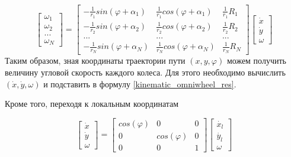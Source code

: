 \documentclass[oneside,final,14pt]{extreport}
\begin{document}
\begin{equation}
\label{kinematic_omniwheel_res}
\begin{bmatrix}
\omega_{1} \\
\omega_{2} \\
...\\
\omega_{N}
\end{bmatrix}
=
\begin{bmatrix}
-\frac{1}{r_{1}}sin(\varphi +\alpha_{1}) &
\frac{1}{r_{1}}cos(\varphi +\alpha_{1}) &
\frac{1}{r_{1}}R_{1}
\\
-\frac{1}{r_{2}}sin(\varphi +\alpha_{2}) &
\frac{1}{r_{2}}cos(\varphi +\alpha_{2}) &
\frac{1}{r_{2}}R_{2}
\\
... & ... & ...
\\
-\frac{1}{r_{N}}sin(\varphi +\alpha_{N}) &
\frac{1}{r_{N}}cos(\varphi +\alpha_{N}) &
\frac{1}{r_{N}}R_{N}
\end{bmatrix}
\begin{bmatrix}
\dot{x} \\
\dot{y} \\
\omega
\end{bmatrix}
\end{equation}
Таким образом, зная координаты траектории пути $(x,y,\varphi)$ можем получить величину угловой скорость каждого колеса. Для этого необходимо вычислить $(\dot{x},\dot{y},\omega)$ и подставить в формулу \ref{kinematic_omniwheel_res}.

Кроме того, переходя к локальным координатам

\begin{equation}
\begin{bmatrix}
\dot{x} \\
\dot{y} \\
\omega
\end{bmatrix}
=
\begin{bmatrix}
cos(\varphi) & 0 & 0 \\
0 & cos(\varphi) & 0 \\
0 & 0 & 1
\end{bmatrix}
\begin{bmatrix}
\dot{x_{l}} \\
\dot{y_{l}} \\
\omega
\end{bmatrix}
\end{equation}
\end{document}
